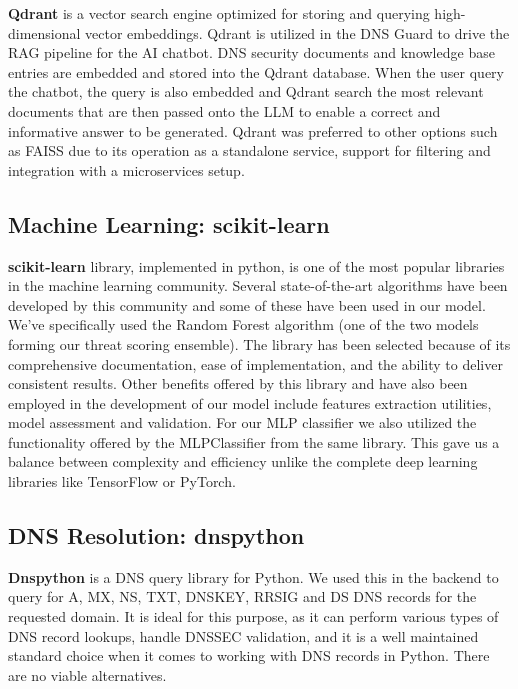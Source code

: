 \documentclass[12pt, a4paper, oneside]{report}
\begin{document}
\textbf{Qdrant} \cite{qdrant2024} is a vector search engine optimized for storing and querying high-dimensional vector embeddings. Qdrant is utilized in the DNS Guard to drive the RAG pipeline for the AI chatbot. DNS security documents and knowledge base entries are embedded and stored into the Qdrant database. When the user query the chatbot, the query is also embedded and Qdrant search the most relevant documents that are then passed onto the LLM to enable a correct and informative answer to be generated. Qdrant was preferred to other options such as FAISS due to its operation as a standalone service, support for filtering and integration with a microservices setup.

\subsection{Machine Learning: scikit-learn}

\textbf{scikit-learn} \cite{pedregosa2011sklearn} library, implemented in python, is one of the most popular libraries in the machine learning community. Several state-of-the-art algorithms have been developed by this community and some of these have been used in our model. We've specifically used the Random Forest algorithm (one of the two models forming our threat scoring ensemble). The library has been selected because of its comprehensive documentation, ease of implementation, and the ability to deliver consistent results. Other benefits offered by this library and have also been employed in the development of our model include features extraction utilities, model assessment and validation. For our MLP classifier we also utilized the functionality offered by the MLPClassifier from the same library. This gave us a balance between complexity and efficiency unlike the complete deep learning libraries like TensorFlow or PyTorch.

\subsection{DNS Resolution: dnspython}

\textbf{Dnspython} \cite{dnspython2024} is a DNS query library for Python. We used this in the backend to query for A, MX, NS, TXT, DNSKEY, RRSIG and DS DNS records for the requested domain. It is ideal for this purpose, as it can perform various types of DNS record lookups, handle DNSSEC validation, and it is a well maintained standard choice when it comes to working with DNS records in Python. There are no viable alternatives.
\end{document}
